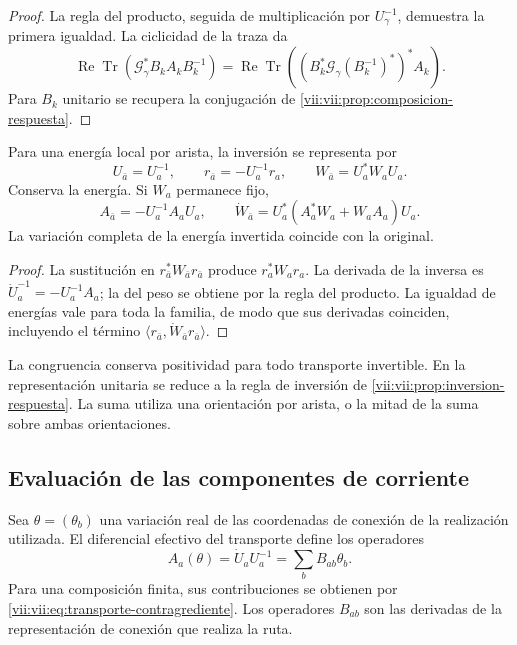 \begin{proof}
La regla del producto, seguida de multiplicación por
\(U_\gamma^{-1}\), demuestra la primera igualdad. La ciclicidad
de la traza da
\[
 \operatorname{Re}\operatorname{Tr}
  (\mathcal G_\gamma^*B_kA_kB_k^{-1})
 =\operatorname{Re}\operatorname{Tr}
  ((B_k^*\mathcal G_\gamma(B_k^{-1})^*)^*A_k).
\]
Para \(B_k\) unitario se recupera la conjugación de
\ref{vii:vii:prop:composicion-respuesta}.
\end{proof}

\begin{proposition}
\label{vii:vii:prop:inversion-congruencia}
Para una energía local por arista, la inversión se representa por
\begin{equation}
 U_{\bar a}=U_a^{-1},\qquad
 r_{\bar a}=-U_a^{-1}r_a,\qquad
 W_{\bar a}=U_a^*W_aU_a.
 \label{vii:vii:eq:inversion-peso-general}
\end{equation}
Conserva la energía. Si \(W_a\) permanece fijo,
\[
 A_{\bar a}=-U_a^{-1}A_aU_a,\qquad
 \dot W_{\bar a}=U_a^*(A_a^*W_a+W_aA_a)U_a.
\]
La variación completa de la energía invertida coincide con la original.
\end{proposition}

\begin{proof}
La sustitución en \(r_{\bar a}^*W_{\bar a}r_{\bar a}\)
produce \(r_a^*W_ar_a\). La derivada de la inversa es
\(\dot U_a^{-1}=-U_a^{-1}A_a\); la del peso se obtiene por
la regla del producto. La igualdad de energías vale para toda la
familia, de modo que sus derivadas coinciden, incluyendo el término
\(\langle r_{\bar a},\dot W_{\bar a}r_{\bar a}\rangle\).
\end{proof}

La congruencia conserva positividad para todo transporte invertible.
En la representación unitaria se reduce a la regla de inversión de
\ref{vii:vii:prop:inversion-respuesta}. La suma utiliza una orientación
por arista, o la mitad de la suma sobre ambas orientaciones.

\subsection{Evaluación de las componentes de corriente}

Sea \(\theta=(\theta_b)\) una variación real de las coordenadas
de conexión de la realización utilizada. El diferencial efectivo del
transporte define los operadores
\begin{equation}
 A_a(\theta)=\dot U_aU_a^{-1}
     =\sum_bB_{ab}\theta_b.
 \label{vii:vii:eq:diferencial-conexion-transporte}
\end{equation}
Para una composición finita, sus contribuciones se obtienen por
\eqref{vii:vii:eq:transporte-contragrediente}. Los operadores
\(B_{ab}\) son las derivadas de la representación de conexión que
realiza la ruta.


